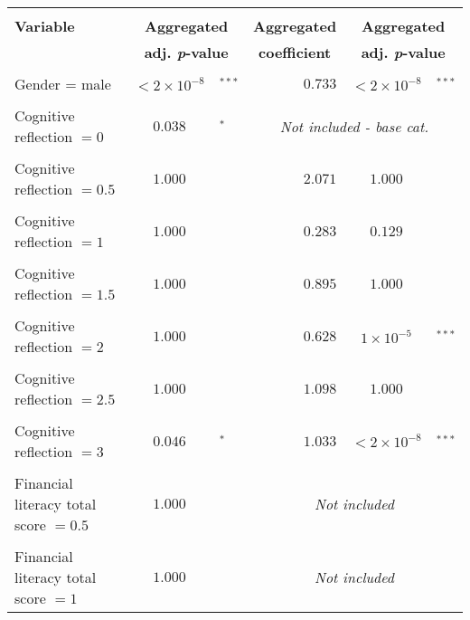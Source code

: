 \documentclass[a4paper,12pt]{article}
\begin{document}
{\begin{threeparttable}
\begin{small}
\begin{tabular}{lclrcl}
\vspace{-0.2cm} \\
  \multicolumn{1}{l}{\vspace{0.1cm}\textbf{Variable}} & \multicolumn{2}{c}{\textbf{Aggregated}}& \multicolumn{1}{c}{\textbf{Aggregated}} &  \multicolumn{2}{c}{\textbf{Aggregated}} \\
    \multicolumn{1}{l}{ } & \multicolumn{2}{c}{\textbf{adj. \textit{p}-value}}& \multicolumn{1}{c}{\textbf{coefficient}} &  \multicolumn{2}{c}{\textbf{adj. \textit{p}-value}} \\
 \hline 
\hline
\\
\vspace{-0.2cm}Gender = male&$<2\times 10^{-8}$&$^{***}$&$0.733$&$<2\times10^{-8}$&$^{***}$\\
  \\
  \vspace{-0.2cm}Cognitive reflection $=0$~\tnote{a}&$0.038$&$^{*}$ &\multicolumn{3}{c}{\textit{Not included - base cat.}}\\
  \\
\vspace{-0.2cm}Cognitive reflection $=0.5$&$1.000$& &$2.071$&$1.000$&\\
  \\
\vspace{-0.2cm}Cognitive reflection $=1$&$1.000$& &$0.283$&$0.129$& \\
  \\
\vspace{-0.2cm}Cognitive reflection $=1.5$&$1.000$& &$0.895$&$1.000$ \\
  \\
\vspace{-0.2cm}Cognitive reflection $=2$&$1.000$& &$0.628$&$1\times 10^{-5}$&$^{***}$\\
  \\
\vspace{-0.2cm}Cognitive reflection $=2.5$&$1.000$& &$1.098$&$1.000$&\\
  \\
  \vspace{-0.2cm}Cognitive reflection $=3$&$0.046$&$^{*}$&$1.033$&$<2\times10^{-8}$&$^{***}$\\
\\
\vspace{-0.2cm}Financial literacy total score $=0.5$&$1.000$& &\multicolumn{3}{c}{\textit{Not included}}\\
  \\
\vspace{-0.2cm}Financial literacy total score $=1$&$1.000$&& \multicolumn{3}{c}{\textit{Not included}} \\

\end{tabular}
\end{small}
\end{threeparttable}}
\end{document}
